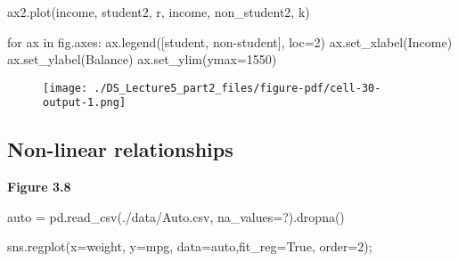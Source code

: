 \documentclass[
  letterpaper,
  DIV=11,
  numbers=noendperiod]{scrreprt}
\newenvironment{Shaded}{\begin{snugshade}}{\end{snugshade}}
\newcommand{\ControlFlowTok}[1]{\textcolor[rgb]{0.00,0.23,0.31}{#1}}
\newcommand{\DecValTok}[1]{\textcolor[rgb]{0.68,0.00,0.00}{#1}}
\newcommand{\KeywordTok}[1]{\textcolor[rgb]{0.00,0.23,0.31}{#1}}
\newcommand{\NormalTok}[1]{\textcolor[rgb]{0.00,0.23,0.31}{#1}}
\newcommand{\OperatorTok}[1]{\textcolor[rgb]{0.37,0.37,0.37}{#1}}
\newcommand{\StringTok}[1]{\textcolor[rgb]{0.13,0.47,0.30}{#1}}
\newcommand{\VariableTok}[1]{\textcolor[rgb]{0.07,0.07,0.07}{#1}}
\begin{document}
\begin{Shaded}
\begin{Highlighting}[]
\NormalTok{ax2.plot(income, student2, }\StringTok{\textquotesingle{}r\textquotesingle{}}\NormalTok{, income, non\_student2, }\StringTok{\textquotesingle{}k\textquotesingle{}}\NormalTok{)}

\ControlFlowTok{for}\NormalTok{ ax }\KeywordTok{in}\NormalTok{ fig.axes:}
\NormalTok{    ax.legend([}\StringTok{\textquotesingle{}student\textquotesingle{}}\NormalTok{, }\StringTok{\textquotesingle{}non{-}student\textquotesingle{}}\NormalTok{], loc}\OperatorTok{=}\DecValTok{2}\NormalTok{)}
\NormalTok{    ax.set\_xlabel(}\StringTok{\textquotesingle{}Income\textquotesingle{}}\NormalTok{)}
\NormalTok{    ax.set\_ylabel(}\StringTok{\textquotesingle{}Balance\textquotesingle{}}\NormalTok{)}
\NormalTok{    ax.set\_ylim(ymax}\OperatorTok{=}\DecValTok{1550}\NormalTok{)}
\end{Highlighting}
\end{Shaded}

\begin{figure}[H]

{\centering \texttt{[image: ./DS\_Lecture5\_part2\_files/figure-pdf/cell-30-output-1.png]}

}

\end{figure}

\hypertarget{non-linear-relationships}{%
\subsection{Non-linear relationships}\label{non-linear-relationships}}

\textbf{Figure 3.8}

\begin{Shaded}
\begin{Highlighting}[]
\NormalTok{auto }\OperatorTok{=}\NormalTok{ pd.read\_csv(}\StringTok{\textquotesingle{}./data/Auto.csv\textquotesingle{}}\NormalTok{, na\_values}\OperatorTok{=}\StringTok{\textquotesingle{}?\textquotesingle{}}\NormalTok{).dropna()}
\end{Highlighting}
\end{Shaded}

\begin{Shaded}
\begin{Highlighting}[]
\NormalTok{sns.regplot(x}\OperatorTok{=}\StringTok{\textquotesingle{}weight\textquotesingle{}}\NormalTok{, y}\OperatorTok{=}\StringTok{\textquotesingle{}mpg\textquotesingle{}}\NormalTok{, data}\OperatorTok{=}\NormalTok{auto,fit\_reg}\OperatorTok{=}\VariableTok{True}\NormalTok{, order}\OperatorTok{=}\DecValTok{2}\NormalTok{)}\OperatorTok{;}
\end{Highlighting}
\end{Shaded}
\end{document}
